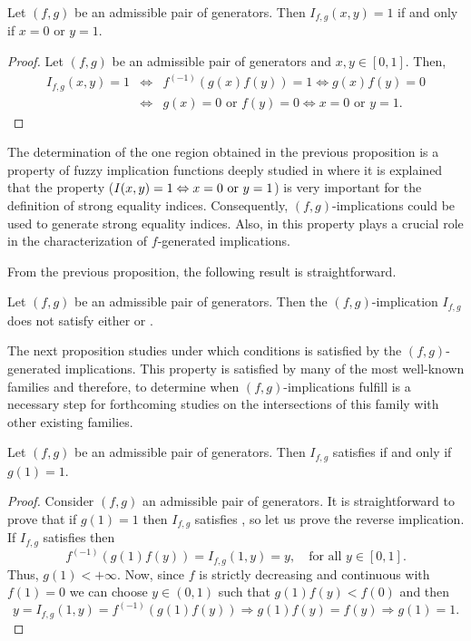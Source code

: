\begin{proposition}\label{onezonefg} Let $(f,g)$ be an admissible pair of generators. Then $I_{f,g}(x,y)=1$ if and only if $x=0$ or $y=1$.
\end{proposition}
\begin{proof} Let $(f,g)$ be an admissible pair of generators and $x,y \in [0,1]$. Then,
	\begin{eqnarray*}
		I_{f,g}(x,y)=1 & \Leftrightarrow & f^{(-1)}(g(x)f(y))=1 \Leftrightarrow g(x)f(y)=0 \\
		& \Leftrightarrow & g(x)=0 \text{ or } f(y)=0 \Leftrightarrow x=0 \text{ or } y=1.
	\end{eqnarray*}
\end{proof}
The determination of the one region obtained in the previous proposition is a property of fuzzy implication functions deeply studied in \cite{Bustince2013} where it is explained that the property ($I(x,y)=1 \Leftrightarrow x=0 \hbox{ or } y=1$) is very important for the definition of strong equality indices. Consequently, $(f,g)$-implications could be used to generate strong equality indices. Also, in \cite{Massanet2012B} this property plays a crucial role in the characterization of $f$-generated implications.

From the previous proposition, the following result is straightforward.

\begin{corollary} Let $(f,g)$ be an admissible pair of generators. Then the $(f,g)$-implication $I_{f,g}$ does not satisfy either \IP or \OP.
\end{corollary}

The next proposition studies under which conditions \NP is satisfied by the $(f,g)$-generated implications. This property is satisfied by many of the most well-known families and therefore, to determine when $(f,g)$-implications fulfill \NP is a necessary step for forthcoming studies on the intersections of this family with other existing families.

\begin{proposition}\label{prop:(f,g):(NP)}
	 Let $(f,g)$ be an admissible pair of generators. Then $I_{f,g}$ satisfies \NP if and only if $g(1)=1$.
\end{proposition}
\begin{proof}
	Consider $(f,g)$ an admissible pair of generators. It is straightforward to prove that if $g(1)=1$ then $I_{f,g}$ satisfies \NP, so let us prove the reverse implication. If $I_{f,g}$ satisfies \NP then
	$$f^{(-1)}(g(1)f(y))=I_{f,g}(1,y)=y, \quad \text{for all } y \in [0,1].$$
	Thus, $g(1)<+\infty$. Now, since $f$ is strictly decreasing and continuous with $f(1)=0$ we can choose $y \in (0,1)$ such that $g(1)f(y)< f(0)$ and then
	$$
	y=I_{f,g}(1,y)=f^{(-1)}(g(1)f(y))  \Rightarrow  g(1)f(y)=f(y) \Rightarrow  g(1)=1.
	$$
\end{proof}

